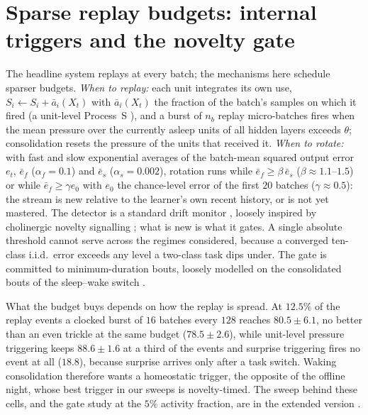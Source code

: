 \documentclass{article}
\begin{document}
\section{Sparse replay budgets: internal triggers and the novelty gate}
\label{app:budget}
The headline system replays at every batch; the mechanisms here schedule sparser budgets.
\emph{When to replay:} each unit integrates its own use, $S_i\leftarrow S_i+\bar a_i(X_t)$
with $\bar a_i(X_t)$ the fraction of the batch's samples on which it fired (a unit-level
Process~S \citep{borbely1982}), and a burst of $n_b$ replay micro-batches fires when the mean
pressure over the currently asleep units of all hidden layers exceeds $\theta$;
consolidation resets the pressure of the units that received it. \emph{When to rotate:}
with fast and slow exponential averages of the batch-mean squared output error $e_t$,
$\bar e_f$ ($\alpha_f{=}0.1$) and $\bar e_s$ ($\alpha_s{=}0.002$), rotation runs while
$\bar e_f\ge\beta\,\bar e_s$ ($\beta\approx1.1$--$1.5$) or while $\bar e_f\ge\gamma e_0$ with
$e_0$ the chance-level error of the first $20$ batches ($\gamma\approx0.5$): the stream is
new relative to the learner's own recent history, or is not yet mastered. The detector is a
standard drift monitor \citep{ross2012}, loosely inspired by cholinergic novelty signalling
\citep{hasselmo2006}; what is new is what it gates. A single absolute threshold cannot serve
across the regimes considered, because a converged ten-class i.i.d.\ error exceeds any level
a two-class task dips under. The gate is committed to minimum-duration bouts, loosely
modelled on the consolidated bouts of the sleep--wake switch \citep{saper2005}.

What the budget buys depends on how the replay is spread. At $12.5\%$ of the replay events a
clocked burst of $16$ batches every $128$ reaches $80.5\pm6.1$, no better than an even
trickle at the same budget ($78.5\pm2.6$), while unit-level pressure triggering keeps
$88.6\pm1.6$ at a third of the events and surprise triggering fires no event at all
($18.8$), because surprise arrives only after a task switch. Waking consolidation therefore
wants a homeostatic trigger, the opposite of the offline night, whose best trigger in our
sweeps is novelty-timed. The sweep behind these cells, and the gate study at the $5\%$
activity fraction, are in the extended version \citep{extended}.
\end{document}
